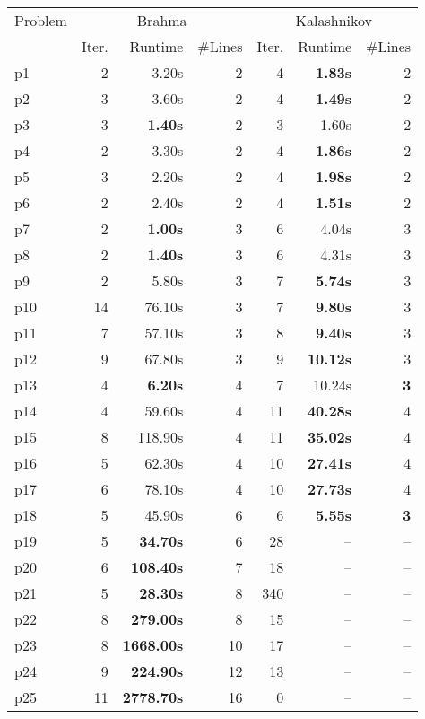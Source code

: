 \begin{tabular}{l||rrr|rrr}
Problem & \multicolumn{3}{c}{\sc Brahma} & \multicolumn{3}{|c}{\sc Kalashnikov} \\
        & Iter. & Runtime & \#Lines & Iter. & Runtime & \#Lines \\
\hline
\hline
p1 & 2 & 3.20s &2 &4 & {\bf 1.83s} &2 \\
p2 & 3 & 3.60s &2 &4 & {\bf 1.49s} &2 \\
p3 & 3 & {\bf 1.40s} &2 &3 & 1.60s &2 \\
p4 & 2 & 3.30s &2 &4 & {\bf 1.86s} &2 \\
p5 & 3 & 2.20s &2 &4 & {\bf 1.98s} &2 \\
p6 & 2 & 2.40s &2 &4 & {\bf 1.51s} &2 \\
p7 & 2 & {\bf 1.00s} &3 &6 & 4.04s &3 \\
p8 & 2 & {\bf 1.40s} &3 &6 & 4.31s &3 \\
p9 & 2 & 5.80s &3 &7 & {\bf 5.74s} &3 \\
p10 & 14 & 76.10s &3 &7 & {\bf 9.80s} &3 \\
p11 & 7 & 57.10s &3 &8 & {\bf 9.40s} &3 \\
p12 & 9 & 67.80s &3 &9 & {\bf 10.12s} &3 \\
p13 & 4 & {\bf 6.20s} &4 &7 & 10.24s &{\bf 3} \\
p14 & 4 & 59.60s &4 &11 & {\bf 40.28s} &4 \\
p15 & 8 & 118.90s &4 &11 & {\bf 35.02s} &4 \\
p16 & 5 & 62.30s &4 &10 & {\bf 27.41s} &4 \\
p17 & 6 & 78.10s &4 &10 & {\bf 27.73s} &4 \\
p18 & 5 & 45.90s &6 &6 & {\bf 5.55s} &{\bf 3} \\
p19 & 5 & {\bf 34.70s} &6 &28 & -- &-- \\
p20 & 6 & {\bf 108.40s} &7 &18 & -- &-- \\
p21 & 5 & {\bf 28.30s} &8 &340 & -- &-- \\
p22 & 8 & {\bf 279.00s} &8 &15 & -- &-- \\
p23 & 8 & {\bf 1668.00s} &10 &17 & -- &-- \\
p24 & 9 & {\bf 224.90s} &12 &13 & -- &-- \\
p25 & 11 & {\bf 2778.70s} &16 &0 & -- &-- \\
\end{tabular}
